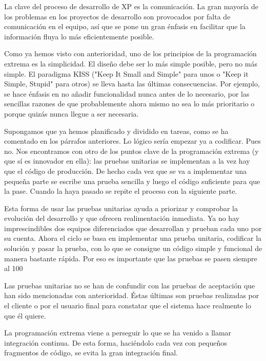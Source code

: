 \documentclass[12pt]{article} %
\begin{document}
			La clave del proceso de desarrollo de XP es la comunicación. La gran mayoría de los problemas en los proyectos de desarrollo son provocados por falta de comunicación
			en el equipo, así que se pone un gran énfasis en facilitar que la información fluya lo más eficientemente posible. 
			
			Como ya hemos visto con anterioridad, uno de los principios de la programación extrema es la simplicidad. El diseño debe ser lo más simple posible, pero no más
			simple. El paradigma KISS ("Keep It Small and Simple" para unos o "Keep it Simple, Stupid" para otros) se lleva hasta las últimas consecuencias. Por ejemplo, se hace
			énfasis en no añadir funcionalidad nunca antes de lo necesario, por las sencillas razones de que probablemente ahora mismo no sea lo más prioritario o porque quizás
			nunca llegue a ser necesaria.
			
			
			Supongamos que ya hemos planificado y dividido en tareas, como se ha comentado en los párrafos anteriores. Lo lógico sería empezar ya a codificar. Pues no. Nos
			encontramos con otro de los puntos clave de la programación extrema (y que sí es innovador en ella): las pruebas unitarias se implementan a la vez hay que el código
			de producción. De hecho cada vez que se va a implementar una pequeña parte se escribe una prueba sencilla y luego el código suficiente para que la pase. Cuando la
			haya pasado se repite el proceso con la siguiente parte.
			
			Esta forma de usar las pruebas unitarias ayuda a priorizar y comprobar la evolución del desarrollo y que ofrecen realimentación inmediata. Ya no hay imprescindibles
			dos equipos diferenciados que desarrollan y prueban cada uno por su cuenta. Ahora el ciclo se basa en implementar una prueba unitaria, codificar la solución y pasar
			la prueba, con lo que se consigue un código simple y funcional de manera bastante rápida. Por eso es importante que las pruebas se pasen siempre al 100%
			 
			Las pruebas unitarias no se han de confundir con las pruebas de aceptación que han sido mencionadas con anterioridad. Éstas últimas son pruebas realizadas por el
			cliente o por el usuario final para constatar que el sistema hace realmente lo que él quiere.
			 
			La programación extrema viene a perseguir lo que se ha venido a llamar integración continua. De esta forma, haciéndolo cada vez con pequeños fragmentos de código, se
			evita la gran integración final. 
			
\end{document}
